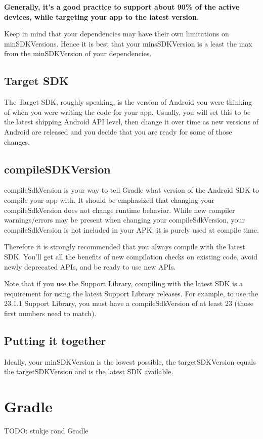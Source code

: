 \textbf{Generally, it’s a good practice to support about 90\% of the active devices, while targeting your app to the latest version.}

Keep in mind that your dependencies may have their own limitations on minSDKVersions.
Hence it is best that your minsSDKVersion is a least the max from the minSDKVersion of your dependencies.

\subsection{Target SDK}
The Target SDK, roughly speaking, is the version of Android you were thinking of when you were writing the code for your app.
Usually, you will set this to be the latest shipping Android API level, then change it over time as new versions of Android are released and you decide that you are ready for some of those changes.

\subsection{compileSDKVersion}
compileSdkVersion is your way to tell Gradle what version of the Android SDK to compile your app with.
It should be emphasized that changing your compileSdkVersion does not change runtime behavior.
While new compiler warnings/errors may be present when changing your compileSdkVersion, your compileSdkVersion is not included in your APK: it is purely used at compile time.

Therefore it is strongly recommended that you always compile with the latest SDK.
You’ll get all the benefits of new compilation checks on existing code, avoid newly deprecated APIs, and be ready to use new APIs.

Note that if you use the Support Library, compiling with the latest SDK is a requirement for using the latest Support Library releases.
For example, to use the 23.1.1 Support Library, you must have a compileSdkVersion of at least 23 (those first numbers need to match).

\subsection{Putting it together}
Ideally, your minSDKVersion is the lowest possible, the targetSDKVersion equals the targetSDKVersion and is the latest SDK available.

\section{Gradle}
TODO: stukje rond Gradle



